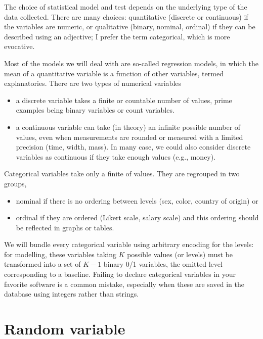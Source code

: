 \documentclass[
  11pt,
  letterpaper,
]{scrbook}
\providecommand{\tightlist}{%
  \setlength{\itemsep}{0pt}\setlength{\parskip}{0pt}}\usepackage{longtable,booktabs,array}
\theoremstyle{definition}
\theoremstyle{definition}
\theoremstyle{plain}
\theoremstyle{remark}
\begin{document}
The choice of statistical model and test depends on the underlying type
of the data collected. There are many choices: quantitative (discrete or
continuous) if the variables are numeric, or qualitative (binary,
nominal, ordinal) if they can be described using an adjective; I prefer
the term categorical, which is more evocative.

Most of the models we will deal with are so-called regression models, in
which the mean of a quantitative variable is a function of other
variables, termed explanatories. There are two types of numerical
variables

\begin{itemize}
\tightlist
\item
  a discrete variable takes a finite or countable number of values,
  prime examples being binary variables or count variables.
\item
  a continuous variable can take (in theory) an infinite possible number
  of values, even when measurements are rounded or measured with a
  limited precision (time, width, mass). In many case, we could also
  consider discrete variables as continuous if they take enough values
  (e.g., money).
\end{itemize}

Categorical variables take only a finite of values. They are regrouped
in two groups,

\begin{itemize}
\tightlist
\item
  nominal if there is no ordering between levels (sex, color, country of
  origin) or
\item
  ordinal if they are ordered (Likert scale, salary scale) and this
  ordering should be reflected in graphs or tables.
\end{itemize}

We will bundle every categorical variable using arbitrary encoding for
the levels: for modelling, these variables taking \(K\) possible values
(or levels) must be transformed into a set of \(K-1\) binary 0/1
variables, the omitted level corresponding to a baseline. Failing to
declare categorical variables in your favorite software is a common
mistake, especially when these are saved in the database using integers
rather than strings.

\section{Random variable}\label{random-variable}
\end{document}
